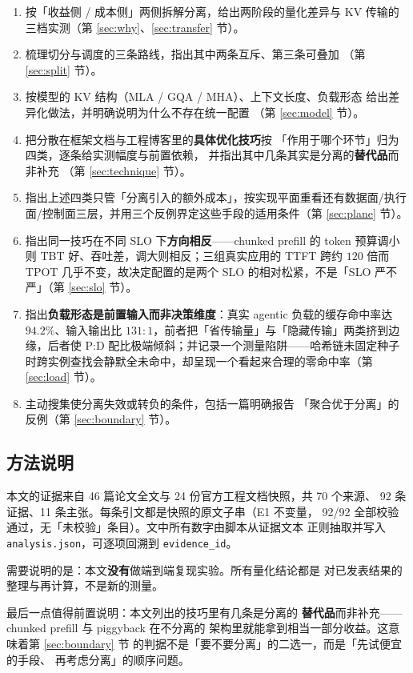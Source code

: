 \begin{enumerate}[leftmargin=1.4em,itemsep=2pt,topsep=3pt]
  \item 按「收益侧 / 成本侧」两侧拆解分离，给出两阶段的量化差异与
        KV 传输的三档实测（第 \ref{sec:why}、\ref{sec:transfer} 节）。
  \item 梳理切分与调度的三条路线，指出其中两条互斥、第三条可叠加
        （第 \ref{sec:split} 节）。
  \item 按模型的 KV 结构（MLA / GQA / MHA）、上下文长度、负载形态
        给出差异化做法，并明确说明为什么不存在统一配置
        （第 \ref{sec:model} 节）。
  \item 把分散在框架文档与工程博客里的\textbf{具体优化技巧}按
        「作用于哪个环节」归为四类，逐条给实测幅度与前置依赖，
        并指出其中几条其实是分离的\textbf{替代品}而非补充
        （第 \ref{sec:technique} 节）。
  \item 指出上述四类只管「分离引入的额外成本」，按实现平面重看还有数据面/执行面/控制面三层，并用三个反例界定这些手段的适用条件（第 \ref{sec:plane} 节）。
  \item 指出同一技巧在不同 SLO 下\textbf{方向相反}——chunked prefill 的 token 预算调小则 TBT 好、吞吐差，调大则相反；三组真实应用的 TTFT 跨约 $120$ 倍而 TPOT 几乎不变，故决定配置的是两个 SLO 的相对松紧，不是「SLO 严不严」（第 \ref{sec:slo} 节）。
  \item 指出\textbf{负载形态是前置输入而非决策维度}：真实 agentic 负载的缓存命中率达 $94.2\%$、输入输出比 $131:1$，前者把「省传输量」与「隐藏传输」两类挤到边缘，后者使 P:D 配比极端倾斜；并记录一个测量陷阱——哈希链未固定种子时跨实例查找会静默全未命中，却呈现一个看起来合理的零命中率（第 \ref{sec:load} 节）。
  \item 主动搜集使分离失效或转负的条件，包括一篇明确报告
        「聚合优于分离」的反例（第 \ref{sec:boundary} 节）。
\end{enumerate}

\subsection{方法说明}

本文的证据来自 46 篇论文全文与 24 份官方工程文档快照，共 70 个来源、
92 条证据、11 条主张。每条引文都是快照的原文子串（E1 不变量，
92/92 全部校验通过，无「未校验」条目）。文中所有数字由脚本从证据文本
正则抽取并写入 \texttt{analysis.json}，可逐项回溯到 \texttt{evidence\_id}。

需要说明的是：本文\textbf{没有}做端到端复现实验。所有量化结论都是
对已发表结果的整理与再计算，不是新的测量。

最后一点值得前置说明：本文列出的技巧里有几条是分离的
\textbf{替代品}而非补充——chunked prefill 与 piggyback 在不分离的
架构里就能拿到相当一部分收益。这意味着第 \ref{sec:boundary} 节
的判据不是「要不要分离」的二选一，而是「先试便宜的手段、
再考虑分离」的顺序问题。
